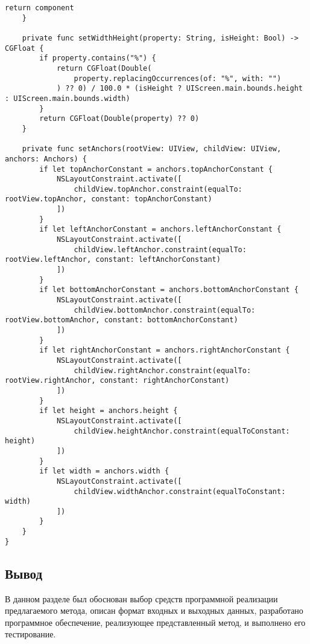 \begin{lstlisting}[caption={Функция определения списка событий, по свершению которых происходит перезагрузка}]
        return component
    }

    private func setWidthHeight(property: String, isHeight: Bool) -> CGFloat {
        if property.contains("%") {
            return CGFloat(Double(
                property.replacingOccurrences(of: "%", with: "")
            ) ?? 0) / 100.0 * (isHeight ? UIScreen.main.bounds.height : UIScreen.main.bounds.width)
        }
        return CGFloat(Double(property) ?? 0)
    }

    private func setAnchors(rootView: UIView, childView: UIView, anchors: Anchors) {
        if let topAnchorConstant = anchors.topAnchorConstant {
            NSLayoutConstraint.activate([
                childView.topAnchor.constraint(equalTo: rootView.topAnchor, constant: topAnchorConstant)
            ])
        }
        if let leftAnchorConstant = anchors.leftAnchorConstant {
            NSLayoutConstraint.activate([
                childView.leftAnchor.constraint(equalTo: rootView.leftAnchor, constant: leftAnchorConstant)
            ])
        }
        if let bottomAnchorConstant = anchors.bottomAnchorConstant {
            NSLayoutConstraint.activate([
                childView.bottomAnchor.constraint(equalTo: rootView.bottomAnchor, constant: bottomAnchorConstant)
            ])
        }
        if let rightAnchorConstant = anchors.rightAnchorConstant {
            NSLayoutConstraint.activate([
                childView.rightAnchor.constraint(equalTo: rootView.rightAnchor, constant: rightAnchorConstant)
            ])
        }
        if let height = anchors.height {
            NSLayoutConstraint.activate([
                childView.heightAnchor.constraint(equalToConstant: height)
            ])
        }
        if let width = anchors.width {
            NSLayoutConstraint.activate([
                childView.widthAnchor.constraint(equalToConstant: width)
            ])
        }
    }
}
\end{lstlisting}

\subsection*{Вывод}

В данном разделе был обоснован выбор средств программной реализации предлагаемого метода, описан формат входных и выходных данных, разработано программное обеспечение, реализующее представленный метод, и выполнено его тестирование.

\pagebreak